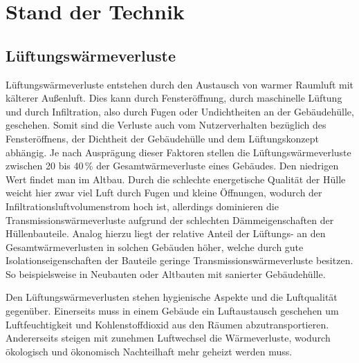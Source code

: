 \chapter{Stand der Technik}

\section{Lüftungswärmeverluste}
\label{sec:Sektion 31}

Lüftungswärmeverluste entstehen durch den Austausch von warmer Raumluft mit kälterer Außenluft.
Dies kann durch Fensteröffnung, durch maschinelle Lüftung und durch Infiltration, also durch Fugen oder Undichtheiten an der Gebäudehülle, geschehen.
Somit sind die Verluste auch vom Nutzerverhalten bezüglich des Fensteröffnens, der Dichtheit der Gebäudehülle und dem Lüftungskonzept abhängig.
Je nach Ausprägung dieser Faktoren stellen die Lüftungswärmeverluste zwischen 20 bis 40\,\% der Gesamtwärmeverluste eines Gebäudes. 
Den niedrigen Wert findet man im Altbau. 
Durch die schlechte energetische Qualität der Hülle weicht hier zwar viel Luft durch Fugen und kleine Öffnungen, wodurch der Infiltrationsluftvolumenstrom hoch ist, allerdings dominieren die Transmissionswärmeverluste aufgrund der schlechten Dämmeigenschaften der Hüllenbauteile.
Analog hierzu liegt der relative Anteil der Lüftungs- an den Gesamtwärmeverlusten in solchen Gebäuden höher, welche durch gute Isolationseigenschaften der Bauteile geringe Transmissionswärmeverluste besitzen.
So beispielsweise in Neubauten oder Altbauten mit sanierter Gebäudehülle.

Den Lüftungswärmeverlusten stehen hygienische Aspekte und die Luftqualität gegenüber.
Einerseits muss in einem Gebäude ein Luftaustausch geschehen um Luftfeuchtigkeit und Kohlenstoffdioxid aus den Räumen abzutransportieren.
Andererseits steigen mit zunehmen Luftwechsel die Wärmeverluste, wodurch ökologisch und ökonomisch Nachteilhaft mehr geheizt werden muss. 

